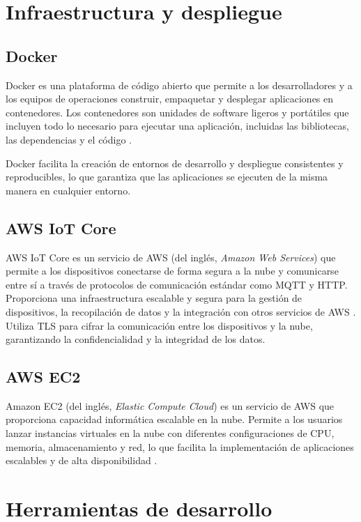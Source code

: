 \section{Infraestructura y despliegue}

\subsection{Docker}

Docker es una plataforma de código abierto que permite a los desarrolladores y
a los equipos de operaciones construir, empaquetar y desplegar aplicaciones en
contenedores. Los contenedores son unidades de software ligeros y portátiles
que incluyen todo lo necesario para ejecutar una aplicación, incluidas las
bibliotecas, las dependencias y el código \cite{Docker}.

Docker facilita la creación de entornos de desarrollo y despliegue consistentes
y reproducibles, lo que garantiza que las aplicaciones se ejecuten de la misma
manera en cualquier entorno.

\subsection{AWS IoT Core}

AWS IoT Core es un servicio de AWS (del inglés, \textit{Amazon Web Services}) que permite a
los dispositivos conectarse de forma segura a la nube y comunicarse entre sí a
través de protocolos de comunicación estándar como MQTT y HTTP. Proporciona una
infraestructura escalable y segura para la gestión de dispositivos, la
recopilación de datos y la integración con otros servicios de AWS
\cite{AWS_IoT}. Utiliza TLS para cifrar la comunicación entre los dispositivos
y la nube, garantizando la confidencialidad y la integridad de los datos.

\subsection{AWS EC2}

Amazon EC2 (del inglés, \textit{Elastic Compute Cloud}) es un servicio de AWS que
proporciona capacidad informática escalable en la nube. Permite a los usuarios
lanzar instancias virtuales en la nube con diferentes configuraciones de CPU,
memoria, almacenamiento y red, lo que facilita la implementación de
aplicaciones escalables y de alta disponibilidad \cite{AWS_EC2}.

\section{Herramientas de desarrollo}

